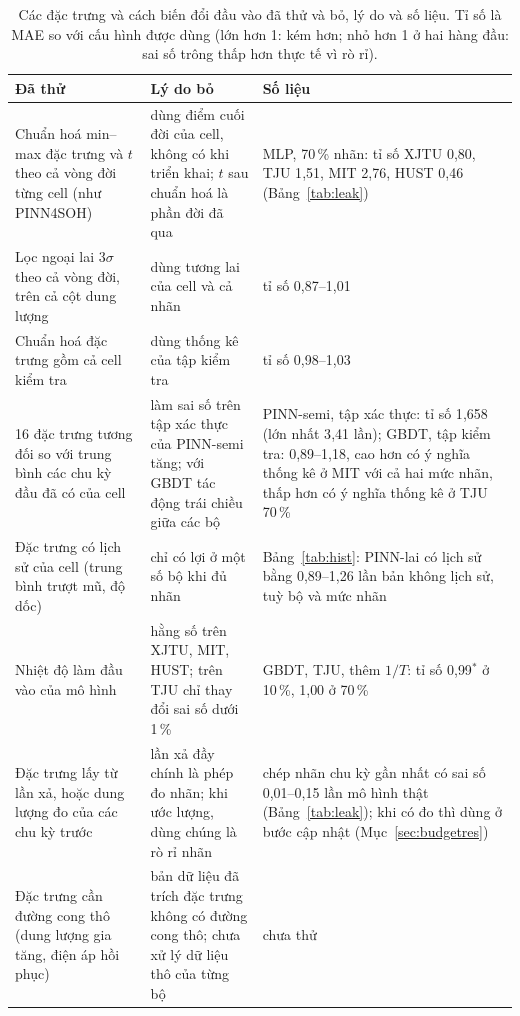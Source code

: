 \begin{table}[!htbp]\centering\small
\caption[Các đặc trưng và cách biến đổi đã thử và bỏ]{Các đặc trưng và cách biến đổi đầu vào đã thử và bỏ, lý do và số liệu. Tỉ số là MAE so với cấu hình được dùng (lớn hơn 1: kém hơn; nhỏ hơn 1 ở hai hàng đầu: sai số trông thấp hơn thực tế vì rò rỉ).}\label{tab:dropped}
\begin{tabularx}{\textwidth}{>{\raggedright}p{3.6cm}>{\raggedright}p{4.2cm}>{\raggedright\arraybackslash}X}\toprule
Đã thử & Lý do bỏ & Số liệu \\\midrule
Chuẩn hoá min--max đặc trưng và $t$ theo cả vòng đời từng cell (như PINN4SOH) & dùng điểm cuối đời của cell, không có khi triển khai; $t$ sau chuẩn hoá là phần đời đã qua & MLP, 70\,\% nhãn: tỉ số XJTU 0{,}80, TJU 1{,}51, MIT 2{,}76, HUST 0{,}46 (Bảng~\ref{tab:leak}) \\
Lọc ngoại lai $3\sigma$ theo cả vòng đời, trên cả cột dung lượng & dùng tương lai của cell và cả nhãn & tỉ số 0{,}87--1{,}01 \\
Chuẩn hoá đặc trưng gồm cả cell kiểm tra & dùng thống kê của tập kiểm tra & tỉ số 0{,}98--1{,}03 \\
16 đặc trưng tương đối so với trung bình các chu kỳ đầu đã có của cell & làm sai số trên tập xác thực của PINN-semi tăng; với GBDT tác động trái chiều giữa các bộ & PINN-semi, tập xác thực: tỉ số 1{,}658 (lớn nhất 3{,}41 lần); GBDT, tập kiểm tra: 0{,}89--1{,}18, cao hơn có ý nghĩa thống kê ở MIT với cả hai mức nhãn, thấp hơn có ý nghĩa thống kê ở TJU 70\,\% \\
Đặc trưng có lịch sử của cell (trung bình trượt mũ, độ dốc) & chỉ có lợi ở một số bộ khi đủ nhãn & Bảng~\ref{tab:hist}: PINN-lai có lịch sử bằng 0{,}89--1{,}26 lần bản không lịch sử, tuỳ bộ và mức nhãn \\
Nhiệt độ làm đầu vào của mô hình & hằng số trên XJTU, MIT, HUST; trên TJU chỉ thay đổi sai số dưới 1\,\% & GBDT, TJU, thêm $1/T$: tỉ số 0{,}99$^{*}$ ở 10\,\%, 1{,}00 ở 70\,\% \\
Đặc trưng lấy từ lần xả, hoặc dung lượng đo của các chu kỳ trước & lần xả đầy chính là phép đo nhãn; khi ước lượng, dùng chúng là rò rỉ nhãn & chép nhãn chu kỳ gần nhất có sai số 0{,}01--0{,}15 lần mô hình thật (Bảng~\ref{tab:leak}); khi có đo thì dùng ở bước cập nhật (Mục~\ref{sec:budgetres}) \\
Đặc trưng cần đường cong thô (dung lượng gia tăng, điện áp hồi phục) & bản dữ liệu đã trích đặc trưng không có đường cong thô; chưa xử lý dữ liệu thô của từng bộ & chưa thử \\
\bottomrule\end{tabularx}\end{table}
